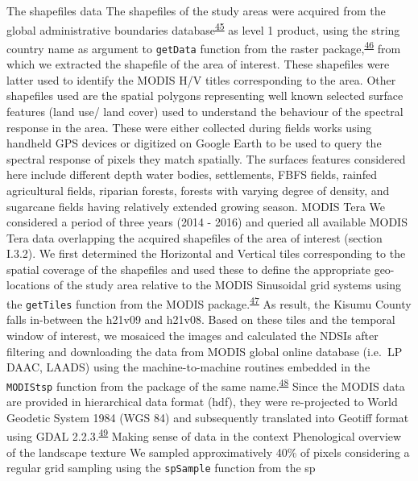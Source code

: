\documentclass[12pt,oneside]{article}
\begin{document}
The shapefiles data The shapefiles of the study areas were acquired from
the global administrative boundaries
database\textsuperscript{\protect\hyperlink{ref-GADM_2018}{45}} as level
1 product, using the string country name as argument to \texttt{getData}
function from the raster
package,\textsuperscript{\protect\hyperlink{ref-Hijmans_2019}{46}} from
which we extracted the shapefile of the area of interest. These
shapefiles were latter used to identify the MODIS H/V titles
corresponding to the area. Other shapefiles used are the spatial
polygons representing well known selected surface features (land use/
land cover) used to understand the behaviour of the spectral response in
the area. These were either collected during fields works using handheld
GPS devices or digitized on Google Earth to be used to query the
spectral response of pixels they match spatially. The surfaces features
considered here include different depth water bodies, settlements, FBFS
fields, rainfed agricultural fields, riparian forests, forests with
varying degree of density, and sugarcane fields having relatively
extended growing season. MODIS Tera We considered a period of three
years (2014 - 2016) and queried all available MODIS Tera data
overlapping the acquired shapefiles of the area of interest (section
I.3.2). We first determined the Horizontal and Vertical tiles
corresponding to the spatial coverage of the shapefiles and used these
to define the appropriate geo-locations of the study area relative to
the MODIS Sinusoidal grid systems using the \texttt{getTiles} function
from the MODIS
package.\textsuperscript{\protect\hyperlink{ref-Mattiuzzi_and_Detsch_2018}{47}}
As result, the Kisumu County falls in-between the h21v09 and h21v08.
Based on these tiles and the temporal window of interest, we mosaiced
the images and calculated the NDSIs after filtering and downloading the
data from MODIS global online database (i.e.~LP DAAC, LAADS) using the
machine-to-machine routines embedded in the \texttt{MODIStsp} function
from the package of the same
name.\textsuperscript{\protect\hyperlink{ref-Busetto_and_ranghetti_2016}{48}}
Since the MODIS data are provided in hierarchical data format (hdf),
they were re-projected to World Geodetic System 1984 (WGS 84) and
subsequently translated into Geotiff format using GDAL
2.2.3.\textsuperscript{\protect\hyperlink{ref-GDAL_OGRcontributors_2018}{49}}
Making sense of data in the context Phenological overview of the
landscape texture We sampled approximatively 40\% of pixels considering
a regular grid sampling using the \texttt{spSample} function from the sp
\end{document}
